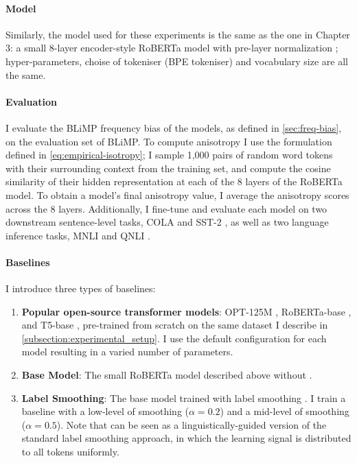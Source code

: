 \paragraph{Model} Similarly, the model used for these experiments is the same as the one in Chapter 3: a small 8-layer encoder-style RoBERTa model with pre-layer normalization \cite{huebner2021babyberta}; hyper-parameters, choise of tokeniser (BPE tokeniser) and vocabulary size are all the same. 

\paragraph{Evaluation} I evaluate the BLiMP frequency bias of the models, as defined in \cref{sec:freq-bias}, on the evaluation set of BLiMP. To compute anisotropy I use the formulation defined in \cref{eq:empirical-isotropy}; I sample 1,000 pairs of random word tokens with their surrounding context from the training set, and compute the cosine similarity of their hidden representation at each of the 8 layers of the RoBERTa model. To obtain a model's final anisotropy value, I average the anisotropy scores across the 8 layers. Additionally, I fine-tune and evaluate each model on two downstream sentence-level tasks, COLA \citep{warstadt2019cola} and SST-2 \citep{socher2013sst}, as well as two language inference tasks, MNLI \citep{williams2018mnli} and QNLI \citep{rajpurkar2016squad, wang2018glue}.


\paragraph{Baselines}

I introduce three types of baselines: 
\begin{enumerate}
    \item \textbf{Popular open-source transformer models}: OPT-125M \citep{zhang2022opt}, RoBERTa-base \citep{liu2019roberta}, and T5-base \citep{raffel2020t5}, pre-trained from scratch on the same dataset I describe in \cref{subsection:experimental_setup}. I use the default configuration for each model resulting in a varied number of parameters.
    \item \textbf{Base Model}: The small RoBERTa model described above without \smoothing.
    \item \textbf{Label Smoothing}: The base model trained with label smoothing \citep{szegedy2016rethinking}. I train a baseline with a low-level of smoothing ($\alpha=0.2$) and a mid-level of smoothing ($\alpha=0.5$). Note that \smoothing can be seen as a linguistically-guided version of the standard label smoothing approach, in which the learning signal is distributed to all tokens uniformly.
\end{enumerate}


